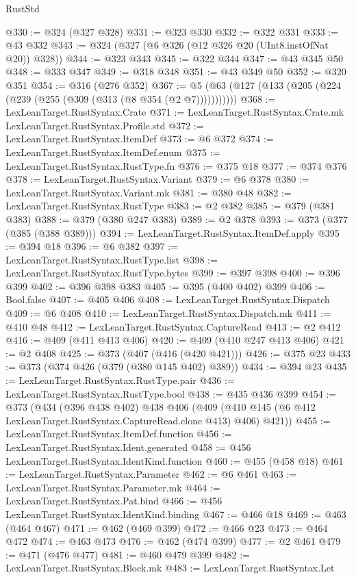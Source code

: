 \begin{lexlean}{RustStd}
\begin{coremodule}
@330 := @324 (@327 @328)
@331 := @323 @330
@332 := @322 @331
@333 := @43 @332
@343 := @324 (@327 (@6 @326 (@12 @326 @20 (UInt8.instOfNat @20)) @328))
@344 := @323 @343
@345 := @322 @344
@347 := @43 @345 @50
@348 := @333 @347
@349 := @318 @348
@351 := @43 @349 @50
@352 := @320 @351
@354 := @316 (@276 @352)
@367 := @5 (@63 (@127 (@133 (@205 (@224 (@239 (@255 (@309 (@313 (@8 @354 (@2 @7)))))))))))
@368 := LexLeanTarget.RustSyntax.Crate
@371 := LexLeanTarget.RustSyntax.Crate.mk LexLeanTarget.RustSyntax.Profile.std
@372 := LexLeanTarget.RustSyntax.ItemDef
@373 := @6 @372
@374 := LexLeanTarget.RustSyntax.ItemDef.enum
@375 := LexLeanTarget.RustSyntax.RustType.fn
@376 := @375 @18
@377 := @374 @376
@378 := LexLeanTarget.RustSyntax.Variant
@379 := @6 @378
@380 := LexLeanTarget.RustSyntax.Variant.mk
@381 := @380 @48
@382 := LexLeanTarget.RustSyntax.RustType
@383 := @2 @382
@385 := @379 (@381 @383)
@388 := @379 (@380 @247 @383)
@389 := @2 @378
@393 := @373 (@377 (@385 (@388 @389)))
@394 := LexLeanTarget.RustSyntax.ItemDef.apply
@395 := @394 @18
@396 := @6 @382
@397 := LexLeanTarget.RustSyntax.RustType.list
@398 := LexLeanTarget.RustSyntax.RustType.bytes
@399 := @397 @398
@400 := @396 @399
@402 := @396 @398 @383
@405 := @395 (@400 @402) @399
@406 := Bool.false
@407 := @405 @406
@408 := LexLeanTarget.RustSyntax.Dispatch
@409 := @6 @408
@410 := LexLeanTarget.RustSyntax.Dispatch.mk
@411 := @410 @48
@412 := LexLeanTarget.RustSyntax.CaptureRead
@413 := @2 @412
@416 := @409 (@411 @413 @406)
@420 := @409 (@410 @247 @413 @406)
@421 := @2 @408
@425 := @373 (@407 (@416 (@420 @421)))
@426 := @375 @23
@433 := @373 (@374 @426 (@379 (@380 @145 @402) @389))
@434 := @394 @23
@435 := LexLeanTarget.RustSyntax.RustType.pair
@436 := LexLeanTarget.RustSyntax.RustType.bool
@438 := @435 @436 @399
@454 := @373
    (@434
      (@396 @438 @402)
      @438
      @406
      (@409 (@410 @145 (@6 @412 LexLeanTarget.RustSyntax.CaptureRead.clone @413) @406) @421))
@455 := LexLeanTarget.RustSyntax.ItemDef.function
@456 := LexLeanTarget.RustSyntax.Ident.generated
@458 := @456 LexLeanTarget.RustSyntax.IdentKind.function
@460 := @455 (@458 @18)
@461 := LexLeanTarget.RustSyntax.Parameter
@462 := @6 @461
@463 := LexLeanTarget.RustSyntax.Parameter.mk
@464 := LexLeanTarget.RustSyntax.Pat.bind
@466 := @456 LexLeanTarget.RustSyntax.IdentKind.binding
@467 := @466 @18
@469 := @463 (@464 @467)
@471 := @462 (@469 @399)
@472 := @466 @23
@473 := @464 @472
@474 := @463 @473
@476 := @462 (@474 @399)
@477 := @2 @461
@479 := @471 (@476 @477)
@481 := @460 @479 @399
@482 := LexLeanTarget.RustSyntax.Block.mk
@483 := LexLeanTarget.RustSyntax.Let

\end{coremodule}
\end{lexlean}
